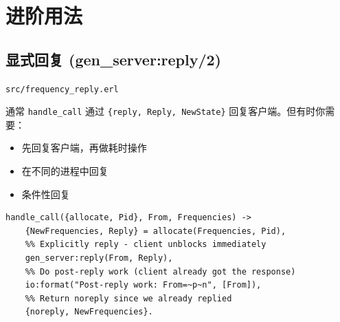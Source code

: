 \documentclass[a4paper,11pt]{article}
\begin{document}
\section{进阶用法}

\subsection{显式回复 (gen\_server:reply/2)}

\begin{notebox}[源码文件]
\texttt{src/frequency\_reply.erl}
\end{notebox}

通常 \texttt{handle\_call} 通过 \texttt{\{reply, Reply, NewState\}} 回复客户端。但有时你需要：
\begin{itemize}[leftmargin=2em]
    \item 先回复客户端，再做耗时操作
    \item 在不同的进程中回复
    \item 条件性回复
\end{itemize}

\begin{lstlisting}[style=erlangstyle, caption={显式回复示例}]
handle_call({allocate, Pid}, From, Frequencies) ->
    {NewFrequencies, Reply} = allocate(Frequencies, Pid),
    %% Explicitly reply - client unblocks immediately
    gen_server:reply(From, Reply),
    %% Do post-reply work (client already got the response)
    io:format("Post-reply work: From=~p~n", [From]),
    %% Return noreply since we already replied
    {noreply, NewFrequencies}.
\end{lstlisting}
\end{document}
